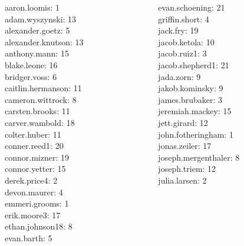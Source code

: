\documentclass[10pt]{beamer}
\begin{document}
\begin{frame}
\footnotesize 
\vfill 
\begin{columns}
\begin{column}{0.33\textwidth}
aaron.loomis: 1 \\ 
adam.wyszynski: 13 \\ 
alexander.goetz: 5 \\ 
alexander.knutson: 13 \\ 
anthony.mann: 15 \\ 
blake.leone: 16 \\ 
bridger.voss: 6 \\ 
caitlin.hermanson: 11 \\ 
cameron.wittrock: 8 \\ 
carsten.brooks: 11 \\ 
carver.wambold: 18 \\ 
colter.huber: 11 \\ 
conner.reed1: 20 \\ 
connor.mizner: 19 \\ 
connor.yetter: 15 \\ 
derek.price4: 2 \\ 
devon.maurer: 4 \\ 
emmeri.grooms: 1 \\ 
erik.moore3: 17 \\ 
ethan.johnson18: 8 \\ 
evan.barth: 5 \\\end{column}
\begin{column}{0.33\textwidth}
evan.schoening: 21 \\ 
griffin.short: 4 \\ 
jack.fry: 19 \\ 
jacob.ketola: 10 \\ 
jacob.ruiz1: 3 \\ 
jacob.shepherd1: 21 \\ 
jada.zorn: 9 \\ 
jakob.kominsky: 9 \\ 
james.brubaker: 3 \\ 
jeremiah.mackey: 15 \\ 
jett.girard: 12 \\ 
john.fotheringham: 1 \\ 
jonas.zeiler: 17 \\ 
joseph.mergenthaler: 8 \\ 
joseph.triem: 12 \\ 
julia.larsen: 2 \\ 

\end{column}
\end{columns}
\end{frame}
\end{document}
